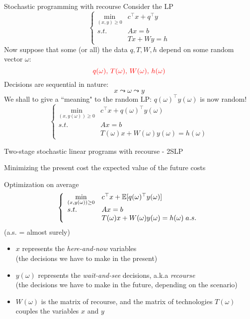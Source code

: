 

\begin{frame}{Stochastic programming with recourse}
Consider the LP
\[
\left\{\begin{array}{ll}
\displaystyle \min_{(x,y)\geq 0} & c^\top x+
q^\top y\\
 s.t. & Ax =  b \\&Tx+Wy=h
\end{array}\right.
\]
Now suppose that some (or all) the data $q,T,W,h$ depend on some random vector $\omega$:
\[
{\color{red}q(\omega),\,T(\omega),\,W(\omega),\,h(\omega)}
\]
Decisions are sequential in nature:
\begin{equation*}
  x \leadsto \omega \leadsto y
\end{equation*}
We shall to give a ``meaning" to the random LP:
$q(\omega)^\top y(\omega)$ is now random!
\[
\left\{\begin{array}{ll}
\displaystyle \min_{(x,y(\omega))\geq 0} & c^\top x+
q(\omega)^\top y(\omega)\\
 s.t. & Ax =  b \\&T(\omega) x+W(\omega)y(\omega)=h(\omega)
\end{array}\right.
\]

\pula
{}
\end{frame}
\begin{frame}{Two-stage stochastic linear programs with recourse - 2SLP}

Minimizing the present cost \verm{\large +} the expected value of the future costs
\pula

\begin{block}{Optimization on average}
\[
\left\{\begin{array}{ll}
\displaystyle \min_{(x,y(\omega))\geq 0} & c^\top x+
\mathbb{E}[q(\omega)^\top y(\omega)]\\
 s.t. & Ax =  b \\&T(\omega) x+W(\omega)y(\omega)=h(\omega) \; a.s.
\end{array}\right.
\]
(a.s. = almost surely)
\end{block}

\begin{itemize}
  \item $x$ represents the \emph{here-and-now} variables \\ (the decisions we have to make in the present)
  \item $y(\omega)$ represents the \emph{wait-and-see} decisions, a.k.a \emph{recourse} \\ (the decisions we have to make in the future, depending on the scenario)
\item $W(\omega)$ is the matrix of recourse, and the matrix of technologies $T(\omega)$ couples the variables $x$ and $y$
\end{itemize}

\end{frame}

